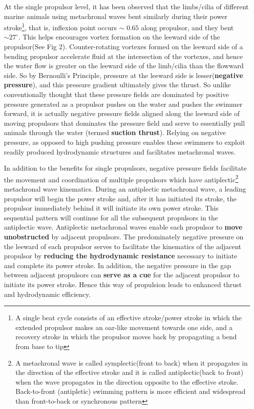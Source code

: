 \documentclass[12pt]{article}
\begin{document}
At the single propulsor level, it has been observed that the  limbs/cilia of different marine animals using metachronal waves bent similarly during their power stroke\footnote{ A single beat cycle consists of an effective stroke/power stroke in which the extended propulsor makes an oar-like movement towards one side, and a recovery stroke in which the propulsor moves back by propagating a bend from base to tip}, that is, inflexion point occurs \texttt{$\sim$} $ 0.65$ along propulsor, and they bent $\sim 27^{\circ}$.  This helps encourages vortex formation on the leeward side of the propulsor(See Fig 2). Counter-rotating vortexes formed on the leeward side of a bending propulsor accelerate fluid at the intersection of the vortexes, and hence the  water flow is greater on the leeward side of the limb/cilia than the flowward side. So by Bernoulli's Principle, pressure at the leeward side is lesser(\textbf{negative pressure}), and this pressure gradient ultimately gives the thrust. So unlike conventionally thought that these pressure fields are dominated by positive pressure generated as a propulsor pushes on the water and pushes the swimmer forward, it is actually negative pressure fields aligned along the leeward side of moving propulsors that dominates the pressure field and serve to essentially pull animals through the water (termed \textbf{suction thrust}). Relying on negative pressure, as opposed to high pushing pressure enables these swimmers to exploit readily produced hydrodynamic structures and facilitates metachronal waves.\\
\par In addition to the benefits for single propulsors, negative pressure fields facilitate the movement and coordination of multiple propulsors which have antiplectic\footnote{A metachronal wave is called symplectic(front to back) when it propagates in the direction of the effective stroke and it is called antiplectic(back to front) when the wave propagates in the direction opposite to the effective stroke. Back-to-front (antipletic) swimming pattern is more efficient and widespread than front-to-back or synchronous pattern} metachronal wave kinematics. During an antiplectic metachronal wave, a leading propulsor will begin the power stroke and, after it has initiated its stroke, the propulsor immediately behind it will initiate its own power stroke. This sequential pattern will continue for all the subsequent propulsors in the antiplectic wave. Antiplectic metachronal waves enable each propulsor to \textbf{move unobstructed} by adjacent propulsors. The predominately negative pressure on the leeward of each propulsor serves to facilitate the kinematics of the adjacent propulsor by \textbf{reducing the hydrodynamic resistance} necessary to initiate and complete its power stroke. In addition, the negative pressure in the gap between adjacent propulsors can \textbf{serve as a cue} for the adjacent propulsor to initiate its power stroke. Hence this way of propulsion leads to enhanced thrust and hydrodynamic efficiency.\\
\end{document}
